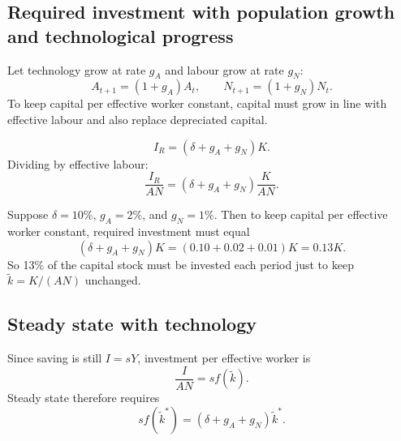 \documentclass[12pt]{article}
\begin{document}
\subsection{Required investment with population growth and technological progress}

Let technology grow at rate $g_A$ and labour grow at rate $g_N$:
\[
A_{t+1}=(1+g_A)A_t,
\qquad
N_{t+1}=(1+g_N)N_t.
\]
To keep capital per effective worker constant, capital must grow in line with effective labour and also replace depreciated capital.

\begin{keyformula}[title={Key Formula: Required investment}]
\[
I_R=(\delta+g_A+g_N)K.
\]
Dividing by effective labour:
\[
\frac{I_R}{AN}=(\delta+g_A+g_N)\frac{K}{AN}.
\]
\end{keyformula}

\begin{examplebox}[title={Worked Example: Required investment share}]
Suppose $\delta=10\%$, $g_A=2\%$, and $g_N=1\%$. Then to keep capital per effective worker constant, required investment must equal
\[
(\delta+g_A+g_N)K=(0.10+0.02+0.01)K=0.13K.
\]
So 13\% of the capital stock must be invested each period just to keep $\tilde{k}=K/(AN)$ unchanged.
\end{examplebox}

\subsection{Steady state with technology}

Since saving is still $I=sY$, investment per effective worker is
\[
\frac{I}{AN}=sf(\tilde{k}).
\]
Steady state therefore requires
\[
sf(\tilde{k}^*)=(\delta+g_A+g_N)\tilde{k}^*.
\]

\begin{center}
\end{center}
\end{document}

